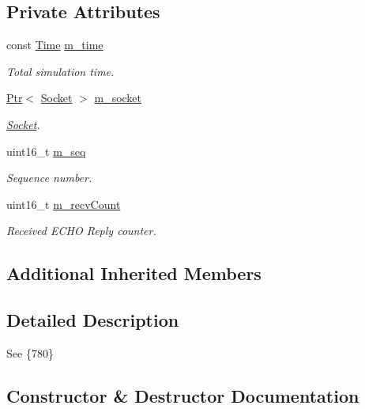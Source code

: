 \subsection*{Private Attributes}
\begin{DoxyCompactItemize}
\item 
const \hyperlink{classns3_1_1Time}{Time} \hyperlink{classns3_1_1olsr_1_1Bug780Test_a58303adf5a19764152e0718970fd38e6}{m\+\_\+time}
\begin{DoxyCompactList}\small\item\em Total simulation time. \end{DoxyCompactList}\item 
\hyperlink{classns3_1_1Ptr}{Ptr}$<$ \hyperlink{classns3_1_1Socket}{Socket} $>$ \hyperlink{classns3_1_1olsr_1_1Bug780Test_ab65d6662ead23b369517b11590e08b09}{m\+\_\+socket}
\begin{DoxyCompactList}\small\item\em \hyperlink{classns3_1_1Socket}{Socket}. \end{DoxyCompactList}\item 
uint16\+\_\+t \hyperlink{classns3_1_1olsr_1_1Bug780Test_aa81457cd42c6d221441deeddc2afe51c}{m\+\_\+seq}
\begin{DoxyCompactList}\small\item\em Sequence number. \end{DoxyCompactList}\item 
uint16\+\_\+t \hyperlink{classns3_1_1olsr_1_1Bug780Test_a01918fdfa2fc906b5d312c2659702187}{m\+\_\+recv\+Count}
\begin{DoxyCompactList}\small\item\em Received E\+C\+HO Reply counter. \end{DoxyCompactList}\end{DoxyCompactItemize}
\subsection*{Additional Inherited Members}


\subsection{Detailed Description}
See \{780\} 

\subsection{Constructor \& Destructor Documentation}
